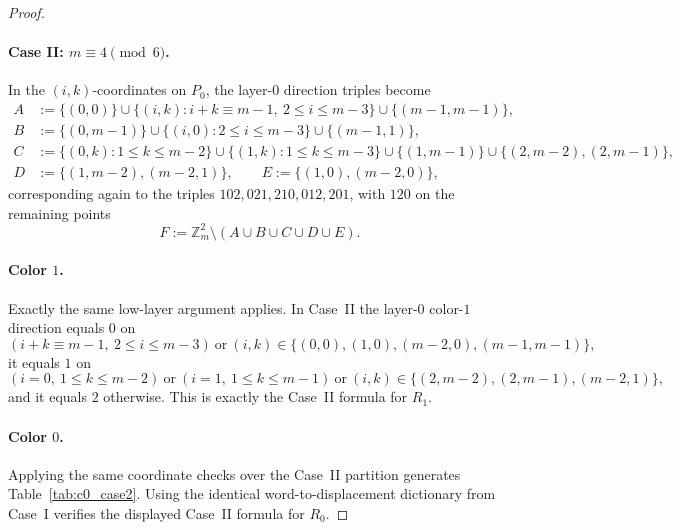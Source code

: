 \begin{proof}
\paragraph{Case II: $m\equiv 4\pmod 6$.}
In the $(i,k)$-coordinates on $P_0$, the layer-$0$ direction triples become
\begin{align*}
A&:=\{(0,0)\}\cup\{(i,k):i+k\equiv m-1,\ 2\le i\le m-3\}\cup\{(m-1,m-1)\},\\
B&:=\{(0,m-1)\}\cup\{(i,0):2\le i\le m-3\}\cup\{(m-1,1)\},\\
C&:=\{(0,k):1\le k\le m-2\}\cup\{(1,k):1\le k\le m-3\}\cup\{(1,m-1)\}\cup\{(2,m-2),(2,m-1)\},\\
D&:=\{(1,m-2),(m-2,1)\},\qquad E:=\{(1,0),(m-2,0)\},
\end{align*}
corresponding again to the triples $102,021,210,012,201$, with $120$ on the remaining points
\[
F:=\mathbb Z_m^2\setminus (A\cup B\cup C\cup D\cup E).
\]

\paragraph{Color $1$.}
Exactly the same low-layer argument applies.
In Case~II the layer-$0$ color-$1$ direction equals $0$ on
\[
(i+k\equiv m-1,\ 2\le i\le m-3)\ \text{or}\ (i,k)\in\{(0,0),(1,0),(m-2,0),(m-1,m-1)\},
\]
it equals $1$ on
\[
(i=0,\ 1\le k\le m-2)\ \text{or}\ (i=1,\ 1\le k\le m-1)\ \text{or}\ (i,k)\in\{(2,m-2),(2,m-1),(m-2,1)\},
\]
and it equals $2$ otherwise.
This is exactly the Case~II formula for $R_1$.

\paragraph{Color $0$.}
Applying the same coordinate checks over the Case~II partition generates Table~\ref{tab:c0_case2}.
Using the identical word-to-displacement dictionary from Case~I verifies the displayed Case~II formula for $R_0$.


\end{proof}
